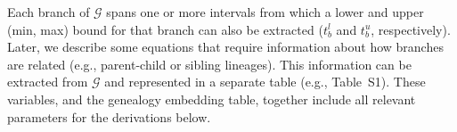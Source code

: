 \documentclass[11pt]{article}
\begin{document}
Each branch of $\mathcal{G}$ spans one or more intervals
from which a lower and upper (min, max) bound for that branch can also be 
extracted ($t_b^l$ and $t_b^u$, respectively). 
Later, we describe some equations that require information about
how branches are related (e.g., parent-child or sibling lineages). 
This information can be extracted from $\mathcal{G}$ and 
represented in a separate table (e.g., Table~S1).
These variables, and the genealogy embedding table, 
together include all relevant parameters for the derivations below. 





\end{document}

